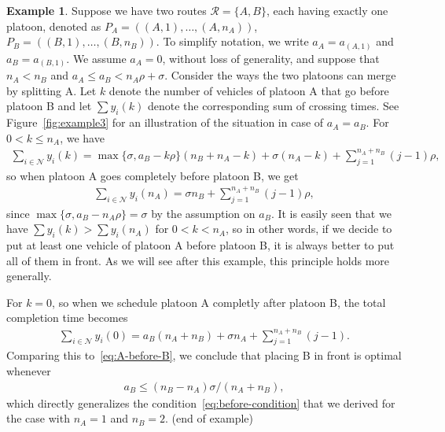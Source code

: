 \documentclass[a4paper]{report}
\theoremstyle{definition}
\newtheorem{eg}{Example}[chapter]
\theoremstyle{plain}
\begin{document}
\begin{eg}
  \label{example3}
  Suppose we have two routes $\mathcal{R} = \{ A, B \}$, each having exactly one
  platoon, denoted as $P_{A} = ((A,1), \dots, (A,n_{A}))$,
  $P_{B} = ((B,1), \dots, (B,n_{B}))$. To simplify notation, we write
  $a_{A} = a_{(A,1)}$ and $a_{B} = a_{(B,1)}$. We assume $a_{A} = 0$, without
  loss of generality, and suppose that $n_{A} < n_{B}$ and
  $a_{A} \leq a_{B} < n_{A}\rho + \sigma$. Consider the ways the two platoons
  can merge by splitting A. Let $k$ denote the number of vehicles of platoon A
  that go before platoon B and let $\sum y_{i}(k)$ denote the corresponding
  sum of crossing times. See Figure~\ref{fig:example3} for an illustration of the
  situation in case of $a_{A} = a_{B}$. For $0 < k \leq n_{A}$, we have
  \begin{align*}
    \sum_{i \in \mathcal{N}} y_{i} (k) = \max\{ \sigma, a_{B} - k\rho\} (n_{B} + n_{A} - k) + \sigma (n_{A} - k) + \sum_{j=1}^{n_{A}+n_{B}} (j-1) \rho ,
  \end{align*}
  so when platoon A goes completely before platoon B, we get
  \begin{align*}
    \sum_{i \in \mathcal{N}} y_{i} (n_{A}) = \sigma n_{B} + \sum_{j=1}^{n_{A}+n_{B}} (j-1) \rho ,
    \label{eq:A-before-B}
  \end{align*}
  since $\max\{ \sigma, a_{B} - n_{A} \rho \} = \sigma$ by the assumption on $a_{B}$. It is
  easily seen that we have $\sum y_{i}(k) > \sum y_{i} (n_{A})$ for $0 < k < n_{A}$,
  so in other words, if we decide to put at least one vehicle of platoon A
  before platoon B, it is always better to put all of them in front. As we will
  see after this example, this principle holds more generally.

  For $k=0$, so when we schedule platoon A completly after platoon B, the total
  completion time becomes
  \begin{align*}
    \sum_{i \in \mathcal{N}} y_{i} (0) = a_{B} (n_{A} + n_{B}) + \sigma n_{A} + \sum_{j=1}^{n_{A}+n_{B}} (j-1) .
  \end{align*}
  Comparing this to~\eqref{eq:A-before-B}, we conclude that placing B in front
  is optimal whenever
  \begin{align*}
    a_{B} \leq (n_{B} - n_{A}) \sigma / (n_{A} + n_{B}) ,
  \end{align*}
  which directly generalizes the condition~\eqref{eq:before-condition} that we
  derived for the case with $n_{A} = 1$ and $n_{B} = 2$. (end of example)
\end{eg}
\end{document}
